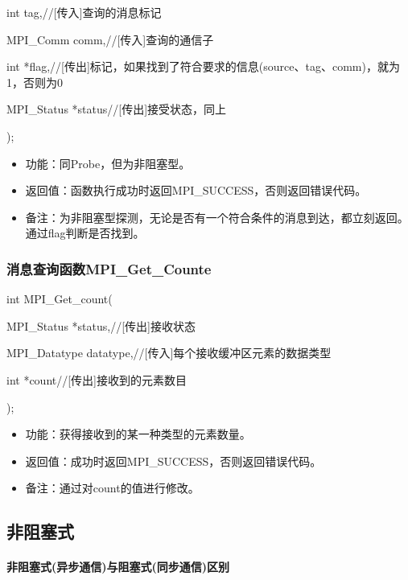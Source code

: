 \documentclass[UTF8]{article}%
\begin{document}
    \qquad int         tag,//[传入]查询的消息标记

    \qquad MPI\_Comm   comm,//[传入]查询的通信子

    \qquad int         *flag,//[传出]标记，如果找到了符合要求的信息(source、tag、comm)，就为1，否则为0

    \qquad MPI\_Status *status//[传出]接受状态，同上

);

\begin{itemize}
    \item 功能：同Probe，但为非阻塞型。
    \item 返回值：函数执行成功时返回MPI\_SUCCESS，否则返回错误代码。
    \item 备注：为非阻塞型探测，无论是否有一个符合条件的消息到达，都立刻返回。通过flag判断是否找到。
\end{itemize}

\subsubsection{消息查询函数MPI\_Get\_Counte}

int MPI\_Get\_count(

    \qquad MPI\_Status   *status,//[传出]接收状态

    \qquad MPI\_Datatype datatype,//[传入]每个接收缓冲区元素的数据类型

    \qquad int          *count//[传出]接收到的元素数目

);

\begin{itemize}
    \item 功能：获得接收到的某一种类型的元素数量。
    \item 返回值：成功时返回MPI\_SUCCESS，否则返回错误代码。
    \item 备注：通过对count的值进行修改。
\end{itemize}

\subsection{非阻塞式}

\paragraph{非阻塞式(异步通信)与阻塞式(同步通信)区别}
\end{document}
